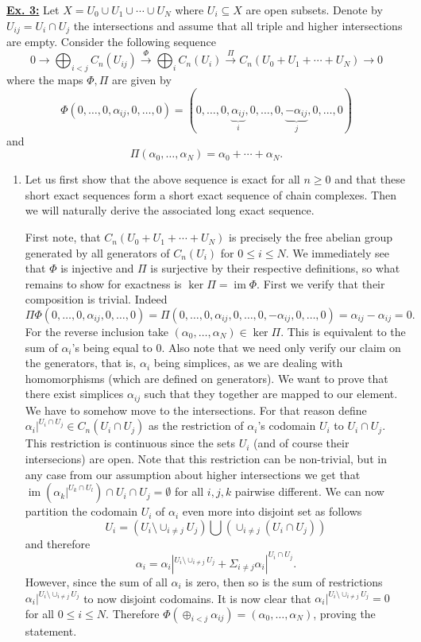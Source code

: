 \documentclass[a4paper, 12pt]{article}
\DeclareMathOperator{\im}{im}
\begin{document}
\underline{\textbf{Ex. 3:}}
Let $X = U_0 \cup U_1 \cup \cdots \cup U_N$ where $U_i \subseteq X$ are open subsets. Denote by $U_{ij} = U_i \cap U_j$ the intersections and assume that all triple and higher intersections are empty. Consider the following sequence
\[
0 \xrightarrow{} \bigoplus_{i<j}C_n(U_{ij}) \xrightarrow{\Phi} \bigoplus_{i}C_n(U_i) \xrightarrow{\Pi} C_n(U_0 + U_1 + \cdots + U_N) \xrightarrow{} 0
\]
where the maps $\Phi, \Pi$ are given by
\[
\Phi(0,\dots, 0, \alpha_{ij}, 0, \dots, 0) = (0, \dots, 0, \underbrace{\alpha_{ij}}_i, 0, \dots, 0, \underbrace{-\alpha_{ij}}_j, 0, \dots, 0)
\]
and
\[
\Pi(\alpha_0, \dots, \alpha_N) = \alpha_0 + \cdots + \alpha_N.
\]
\begin{enumerate}
	\item Let us first show that the above sequence is exact for all $n\geq 0$ and that these short exact sequences form a short exact sequence of chain complexes. Then we will naturally derive the associated long exact sequence.
	
	First note, that $C_n(U_0 + U_1 + \cdots + U_N)$ is precisely the free abelian group generated by all generators of $C_n(U_i)$ for $0 \leq i \leq N$. We immediately see that $\Phi$ is injective and $\Pi$ is surjective by their respective definitions, so what remains to show for exactness is $\ker\Pi = \im\Phi$. First we verify that their composition is trivial. Indeed
	\[
	\Pi\Phi(0,\dots,0,\alpha_{ij}, 0, \dots, 0) = \Pi(0, \dots, 0, \alpha_{ij}, 0, \dots, 0, -\alpha_{ij}, 0, \dots, 0) = \alpha_{ij} - \alpha_{ij} = 0.
	\]
	For the reverse inclusion take $(\alpha_0, \dots, \alpha_N) \in \ker\Pi$. This is equivalent to the sum of $\alpha_i$'s being equal to $0$. Also note that we need only verify our claim on the generators, that is, $\alpha_i$ being simplices, as we are dealing with homomorphisms (which are defined on generators).
	We want to prove that there exist simplices $\alpha_{ij}$ such that they together are mapped to our element. We have to somehow move to the intersections. For that reason define $\alpha_i|^{U_i\cap U_j} \in C_n(U_i \cap U_j)$ as the restriction of $\alpha_i$'s codomain $U_i$ to $U_i \cap U_j$. This restriction is continuous since the sets $U_i$ (and of course their intersecions) are open. Note that this restriction can be non-trivial, but in any case from our assumption about higher intersections we get that $\im(\alpha_k|^{U_k \cap U_l}) \cap U_i \cap U_j = \emptyset$ for all $i, j, k$ pairwise different. We can now partition the codomain $U_i$ of $\alpha_i$ even more into disjoint set as follows
	\[
	U_i = (U_i \setminus \cup_{i \neq j} U_j) \bigcup (\cup_{i \neq j}(U_i \cap U_j))
	\]
	and therefore
	\[
	\alpha_i = \alpha_i|^{U_i \setminus \cup_{i \neq j}U_j} + \Sigma_{i \neq j}\alpha_i|^{U_i \cap U_j}.
	\]
	However, since the sum of all $\alpha_i$ is zero, then so is the sum of restrictions $\alpha_i|^{U_i \setminus \cup_{i \neq j}U_j}$ to now disjoint codomains. It is now clear that $\alpha_i|^{U_i \setminus \cup_{i \neq j}U_j} = 0$ for all $0 \leq i \leq N$. Therefore $\Phi(\oplus_{i<j}\alpha_{ij}) = (\alpha_0,\dots, \alpha_N)$, proving the statement.
	

\end{enumerate}
\end{document}
